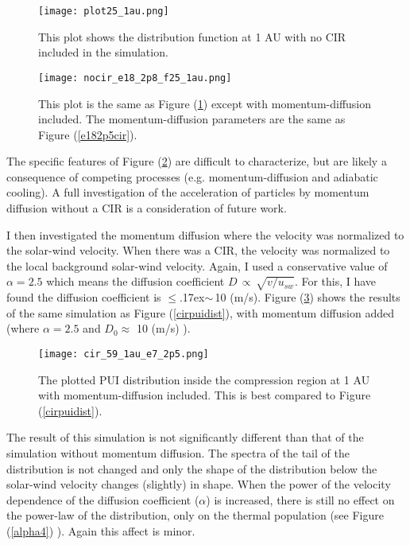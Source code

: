 \documentclass[%
 reprint,
 amsmath,amssymb,
 aps,
]{revtex4-1}
\begin{document}
\begin{figure}[h]
\texttt{[image: plot25\_1au.png]}
\caption{This plot shows the distribution function at 1 AU with no CIR included in the simulation. \label{nocirnomom}}
\end{figure}

\begin{figure}[h]
\texttt{[image: nocir\_e18\_2p8\_f25\_1au.png]}
\caption{This plot is the same as Figure (\ref{nocirnomom}) except with momentum-diffusion included. The momentum-diffusion parameters are the same as Figure (\ref{e182p5cir}).   \label{nocirmom}}
\end{figure}

The specific features of Figure (\ref{nocirmom}) are difficult to characterize, but are likely a consequence of competing processes (e.g. momentum-diffusion and adiabatic cooling). A full investigation of the acceleration of particles by momentum diffusion without a CIR is a consideration of future work.

I then investigated the momentum diffusion where the velocity was normalized to the solar-wind velocity. When there was a CIR, the velocity was normalized to the local background solar-wind velocity. Again, I used a conservative value of $\alpha = 2.5$ which means the diffusion coefficient $D \, \propto \,\sqrt{v/u_{sw}}$. For this, I have found the diffusion coefficient is $\leq$\raise.17ex\hbox{$\scriptstyle\sim$}\,10 (m/s). Figure (\ref{cirmd}) shows the results of the same simulation as Figure (\ref{cirpuidist}), with momentum diffusion added (where $\alpha = 2.5$ and $D_0 \approx$ 10 (m/s) ).

\begin{figure}[h]
\texttt{[image: cir\_59\_1au\_e7\_2p5.png]}
\caption{The plotted PUI distribution inside the compression region at 1 AU with momentum-diffusion included. This is best compared to Figure (\ref{cirpuidist}). \label{cirmd}}
\end{figure}

The result of this simulation is not significantly different than that of the simulation without momentum diffusion. The spectra of the tail of the distribution is not changed and only the shape of the distribution below the solar-wind velocity changes (slightly) in shape. When the power of the velocity dependence of the diffusion coefficient ($\alpha$) is increased, there is still no effect on the power-law of the distribution, only on the thermal population (see Figure (\ref{alpha4}) ). Again this affect is minor.
\end{document}
